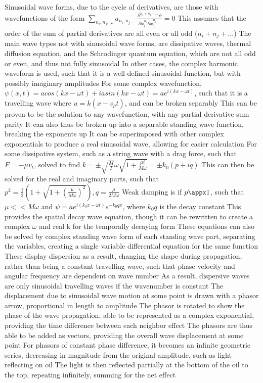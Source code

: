 \documentclass[11 pt, twoside]{article}
\newenvironment{outline*}
{
	\begin{outline}[enumerate]
	}
	{\end{outline}
}
\begin{document}
\begin{outline*}
\1 Sinusoidal wave forms, due to the cycle of derivatives, are those with wavefunctions of the form $\sum_{n_i, n_j, \dots} a_{n_i, n_j, \dots} \frac{\partial^{n_i + n_j + \dots}\psi}{\partial x_i^{n_i} \partial x_j^{n_j} \dots} = 0$
\2 This assumes that the order of the sum of partial derivatives are all even or all odd ($n_i + n_j + \dots$)
\2 The main wave types not with sinusoidal wave forms, are dissipative waves, thermal diffusion equation, and the Schrodinger quantum equation, which are not all odd or even, and thus not fully sinusoidal
\3 In other cases, the complex harmonic waveform is used, such that it is a well-defined sinusoidal function, but with possibly imaginary amplitudes
\2 For some complex wavefunction, $\psi(x, t) = acos(kx - \omega t) + iasin(kx - \omega t) = ae^{i(kx - \omega t)}$, such that it is a travelling wave where $u = k(x - v_pt)$, and can be broken separably
\3 This can be proven to be the solution to any wavefunction, with any partial derivative sum parity
\3 It can also thus be broken up into a separable standing wave function, breaking the exponents up
\3 It can be superimposed with other complex exponentials to produce a real sinusoidal wave, allowing for easier calculation
\2 For some dissipative system, such as a string wave with a drag force, such that $F = -\mu v_t$, solved to find $k = \pm \sqrt{\frac{M}{T}}\omega\sqrt{1 + \frac{\mu i}{M \omega}} = \pm k_0(p + iq)$
\3 This can then be solved for the real and imaginary parts, such that $p^2 = \frac{1}{2}(1 + \sqrt{1 + (\frac{\mu}{M\omega})^2}), q = \frac{\mu}{2M\omega}$
\3 Weak damping is if $p \appx 1$, such that $\mu << M\omega$ and $\psi = ae^{i(k_0x - \omega t)}e^{-k_0qx}$, where $k_0q$ is the decay constant
\3 This provides the spatial decay wave equation, though it can be rewritten to create a complex $\omega$ and real k for the temporally decaying form
\3 These equations can also be solved by complex standing wave form of each standing wave part, separating the variables, creating a single variable differential equation for the same function
\3 These display dispersion as a result, changing the shape during propagation, rather than being a constant travelling wave, such that phase velocity and angular frequency are dependent on wave number
\4 As a result, dispersive waves are only sinusoidal travelling waves if the wavenumber is constant
\1 The displacement due to sinusoidal wave motion at some point is drawn with a phasor arrow, proportional in length to amplitude
\2 The phasor is rotated to show the phase of the wave propagation, able to be represented as a complex exponential, providing the time difference between each neighbor effect
\2 The phasors are thus able to be added as vectors, providing the overall wave displacement at some point
\3 For phasors of constant phase difference, it becomes an infinite geometric series, decreasing in magnitude from the original amplitude, such as light reflecting on oil
\3 The light is then reflected partially at the bottom of the oil to the top, repeating infinitely, summing for the net effect
\end{outline*}
\end{document}
